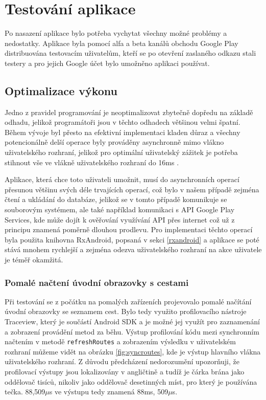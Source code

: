 \documentclass[czech,master,public,dept460,male,java,cpdeclaration]{diploma}
\begin{document}
\section{Testování aplikace}
Po nasazení aplikace bylo potřeba vychytat všechny možné problémy a nedostatky.
Aplikace byla pomocí alfa a beta kanálů obchodu Google Play
distribuována testovacím uživatelům, kteří se po otevření zaslaného odkazu stali testery a pro jejich
Google účet bylo umožněno aplikaci používat.

\subsection{Optimalizace výkonu}
Jedno z pravidel programování je neoptimalizovat zbytečně dopředu na základě odhadu,
jelikož programátoři jsou v těchto odhadech většinou velmi špatní. Během vývoje byl přesto na efektivní
implementaci kladen důraz a všechny potencionálně delší operace byly prováděny asynchronně mimo vlákno
uživatelského rozhraní, jelikož pro optimální uživatelský zážitek je potřeba stihnout vše ve vlákně
uživatelského rozhraní do 16ms \cite{perf}.

Aplikace, která chce toto uživateli umožnit, musí do asynchronních operací přesunou většinu svých déle
trvajících operací, což bylo v našem případě zejména čtení a ukládání do databáze, jelikož se v tomto
 případě komunikuje se souborovým systémem, ale také například komunikaci s API Google Play Services,
 kde může dojít k ověřování využívání API přes internet což už z principu znamená poměrně dlouhou
 prodlevu. Pro implementaci těchto operací byla použita knihovna RxAndroid, popsaná v sekci \ref{rxandroid}
 a aplikace se poté stává mnohem rychlejší a zejména odezva uživatelského rozhraní
 na akce uživatele je téměř okamžitá.

\subsubsection{Pomalé načtení úvodní obrazovky s cestami}
 Při testování se z počátku na pomalých zařízeních projevovalo pomalé načítání úvodní obrazovky se
 seznamem cest. Bylo tedy využito profilovacího nástroje Traceview, který je součástí Android SDK
  a je možné jej využít pro zaznamenání a zobrazení provádění metod za běhu. Výstup profilování kódu
  mezi synchronním načtením v metodě \texttt{refreshRoutes} a zobrazením výsledku v uživatelském rozhraní
  můžeme vidět na obrázku \ref{fig:syncroutes}, kde je výstup hlavního vlákna uživatelského rozhraní.
  Z důvodu předcházení nedorozumění upozorňuji, že profilovací výstupy jsou lokalizovány
  v angličtině a tudíž je čárka brána jako oddělovač tisíců, nikoliv jako oddělovač desetinných míst,
  pro který je používána tečka. 88,509$\mu$s ve výstupu tedy znamená 88ms, 509$\mu$s.
\end{document}

